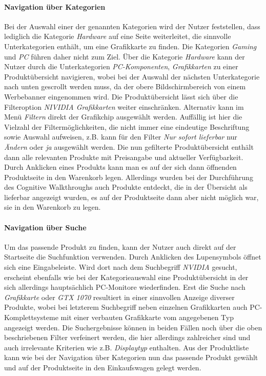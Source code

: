 \documentclass[	12pt, 
				a4paper, 
				BCOR=10mm, %
				DIV=12, 
				parskip=half, %
				headings=small, %
				twoside, %
				ngerman,
				bibliography=totoc,index=totoc, listof=totoc,
				numbers=noendperiod
				]{scrbook} %
\theoremstyle{plain}%
\theoremstyle{definition}
\theoremstyle{remark}
\begin{document}
\paragraph{Navigation über Kategorien} Bei der Auswahl einer der genannten Kategorien wird der Nutzer feststellen, dass lediglich die Kategorie \textit{Hardware} auf eine Seite weiterleitet, die sinnvolle Unterkategorien enthält, um eine Grafikkarte zu finden. Die Kategorien \textit{Gaming} und \textit{PC} führen daher nicht zum Ziel. Über die Kategorie \textit{Hardware} kann der Nutzer durch die Unterkategorien \textit{PC-Komponenten}, \textit{Grafikkarten} zu einer Produktübersicht navigieren, wobei bei der Auswahl der nächsten Unterkategorie nach unten gescrollt werden muss, da der obere Bildschirmbereich von einem Werbebanner eingenommen wird. Die Produktübersicht lässt sich über die Filteroption \textit{NIVIDIA Grafikkarten} weiter einschränken. Alternativ kann im Menü \textit{Filtern} direkt der Grafikchip ausgewählt werden. Auffällig ist hier die Vielzahl der Filtermöglichkeiten, die nicht immer eine eindeutige Beschriftung sowie Auswahl aufweisen, z.B. kann für den Filter \textit{Nur sofort lieferbar} nur \textit{Ändern} oder \textit{ja} ausgewählt werden. Die nun gefilterte Produktübersicht enthält dann alle relevanten Produkte mit Preisangabe und aktueller Verfügbarkeit. Durch Anklicken eines Produkts kann man es auf der sich dann öffnenden Produktseite in den Warenkorb legen. Allerdings wurden bei der Durchführung des Cognitive Walkthroughs auch Produkte entdeckt, die in der Übersicht als lieferbar angezeigt wurden, es auf der Produktseite dann aber nicht möglich war, sie in den Warenkorb zu legen.

\paragraph{Navigation über Suche} Um das passende Produkt zu finden, kann der Nutzer auch direkt auf der Startseite die Suchfunktion verwenden. Durch Anklicken des Lupensymbols öffnet sich eine Eingabeleiste. Wird dort nach dem Suchbegriff \textit{NVIDIA} gesucht, erscheint ebenfalls wie bei der Kategorieauswahl eine Produktübersicht in der sich allerdings hauptsächlich PC-Monitore wiederfinden. Erst die Suche nach \textit{Grafikkarte} oder \textit{GTX 1070} resultiert in einer sinnvollen Anzeige diverser Produkte, wobei bei letzterem Suchbegriff neben einzelnen Grafikkarten auch PC-Komplettsysteme mit einer verbauten Grafikkarte vom angegebenen Typ angezeigt werden. Die Suchergebnisse können in beiden Fällen noch über die oben beschriebenen Filter verfeinert werden, die hier allerdings zahlreicher sind und auch irrelevante Kriterien wie z.B. \textit{Displaytyp} enthalten. Aus der Produktliste kann wie bei der Navigation über Kategorien nun das passende Produkt gewählt und auf der Produktseite in den Einkaufswagen gelegt werden.
\end{document}
